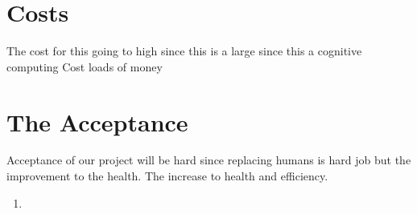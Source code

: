 \documentclass{article}
\begin{document}
\section{Costs}
The cost for this going to high since this is a large since this a cognitive computing 
Cost loads of money

\section{The Acceptance}
Acceptance of our project will be hard since replacing humans is hard job but the improvement to the health. The increase to health and efficiency.

\begin{enumerate}
    \item 
\end{enumerate}
\end{document}
